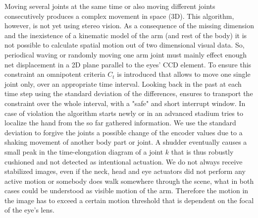 Moving several joints at the same time or also moving different joints consecutively produces a complex movement in space (3D). This algorithm, however, is not yet using stereo vision. As a consequence of the missing dimension and the inexistence of a kinematic model of the arm (and rest of the body) it is not possible to calculate spatial motion out of two dimensional visual data. So, periodical waving or randomly moving one arm joint must mainly effect enough net displacement in a 2D plane parallel to the eyes' CCD element. 
To ensure this constraint an omnipotent criteria $ C_t $ is introduced that allows to move one single joint only, over an appropriate time interval. Looking back in the past at each time step using the standard deviation of the differences, ensures to transport the constraint over the whole interval, with a "safe" and short interrupt window.  In case of violation the algorithm starts newly or in an advanced stadium tries to localize the hand from the so far gathered information. We use the standard deviation to forgive the joints a possible change of the encoder values due to a shaking movement of another body part or joint. A shudder eventually causes a small peak in the time-elongation diagram of a joint $k$ that is thus robustly cushioned and not detected as intentional actuation.
%
We do not always receive stabilized images, even if the neck, head and eye actuators did not perform any active motion or somebody does walk somewhere through the scene, what in both cases could be understood as visible motion of the arm. Therefore the motion in the image has to exceed a certain motion threshold that is dependent on the focal of the eye's lens.
%
%
%
